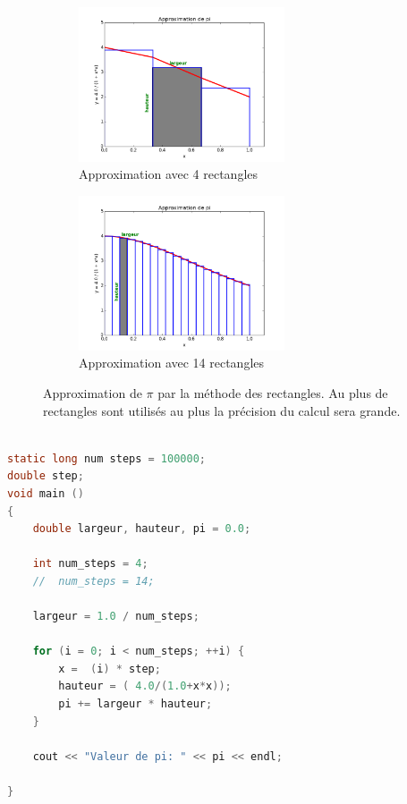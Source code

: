 \begin{figure}[t!]
    \centering
    \begin{subfigure}[t]{0.5\textwidth}
        \centering
        \includegraphics[height=1.8in]{images/Chapitre1/pic_pi_rect_1.png}
        \caption{Approximation avec 4 rectangles \label{pic_pi_1}}
    \end{subfigure}%
\begin{subfigure}[t]{0.5\textwidth}
        \centering
        \includegraphics[height=1.8in]{images/Chapitre1/pic_pi_rect_2.png}
        \caption{Approximation avec 14 rectangles \label{pic_pi_2}}
    \end{subfigure}
    \caption{Approximation de $\pi$ par la méthode des rectangles. Au plus de rectangles sont utilisés au plus la précision du calcul sera grande.}
    \label{pic_pi_rect}
\end{figure}

\begin{lstlisting}[language=C, caption=Implémentions de l'algorithme de calcul d'intégrale par la méthode des rectangles, float,floatplacement=H]

static long num steps = 100000; 
double step;
void main ()
{
    double largeur, hauteur, pi = 0.0;

    int num_steps = 4;
    //  num_steps = 14;

    largeur = 1.0 / num_steps;

    for (i = 0; i < num_steps; ++i) {
        x =  (i) * step;
        hauteur = ( 4.0/(1.0+x*x));
        pi += largeur * hauteur;
    }
    
    cout << "Valeur de pi: " << pi << endl;

}
\end{lstlisting}

